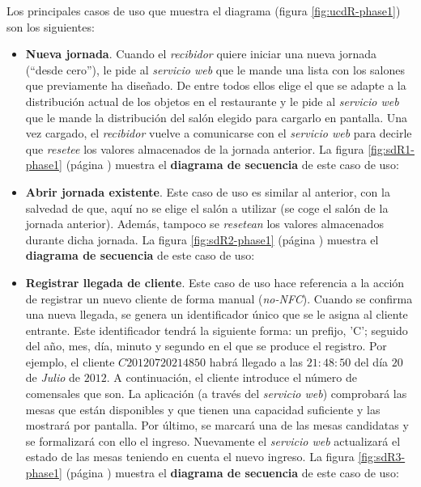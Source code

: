 Los principales casos de uso que muestra el diagrama (figura
\ref{fig:ucdR-phase1}) son los siguientes:
\begin{itemize}
\item \textbf{Nueva jornada}. Cuando el \emph{recibidor} quiere iniciar una
nueva jornada (``desde cero''), le pide al \emph{servicio web} que le mande 
una lista con los salones que previamente ha diseñado. De entre todos ellos
elige el que se adapte a la distribución actual de los objetos en el
restaurante y le pide al \emph{servicio web} que le mande la distribución del
salón elegido para cargarlo en pantalla. Una vez cargado, el \emph{recibidor}
vuelve a comunicarse con el \emph{servicio web} para decirle que \emph{resetee}
los valores almacenados de la jornada anterior. La figura \ref{fig:sdR1-phase1}
(página \pageref{fig:sdR1-phase1}) muestra el \textbf{diagrama de secuencia} 
de este caso de uso:

\item \textbf{Abrir jornada existente}. Este caso de uso es similar al
anterior, con la salvedad de que, aquí no se elige el salón a
utilizar (se coge el salón de la jornada anterior). Además, tampoco se
\emph{resetean} los valores almacenados durante dicha jornada. La figura
\ref{fig:sdR2-phase1} (página \pageref{fig:sdR2-phase1}) muestra el
\textbf{diagrama de secuencia} de este caso de uso:

\item \textbf{Registrar llegada de cliente}. Este caso de uso hace referencia
a la acción de registrar un nuevo cliente de forma manual
(\emph{no-\acs{NFC}}). Cuando se confirma una nueva llegada, se
genera un identificador único que se le asigna al cliente entrante.
Este identificador tendrá la siguiente forma: un prefijo, 'C'; seguido del
año, mes, día, minuto y segundo en el que se produce el registro. Por ejemplo,
el cliente $C20120720214850$ habrá llegado a las $21:48:50$ del día $20$ de
\emph{Julio} de $2012$. A continuación, el cliente introduce el número de
comensales que son. La aplicación (a través del \emph{servicio web})
comprobará las mesas que están disponibles y que tienen una capacidad
suficiente y las mostrará por pantalla. Por último, se marcará una de las
mesas candidatas y se formalizará con ello el ingreso. Nuevamente el
\emph{servicio web} actualizará el estado de las mesas teniendo en cuenta el
nuevo ingreso. La figura \ref{fig:sdR3-phase1} (página
\pageref{fig:sdR3-phase1}) muestra el \textbf{diagrama de secuencia} de este
caso de uso:


\end{itemize}
